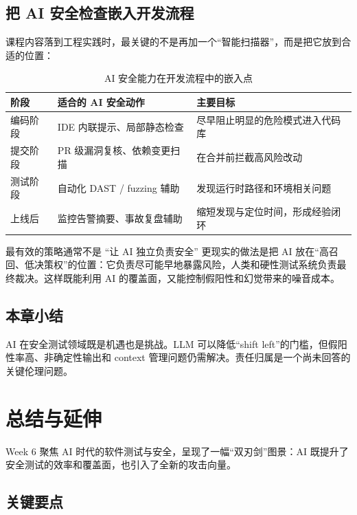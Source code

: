 \documentclass[a4paper]{article}
\begin{document}
\subsection{把 AI 安全检查嵌入开发流程}

课程内容落到工程实践时，最关键的不是再加一个“智能扫描器”，而是把它放到合适的位置：

\begin{table}[H]
\centering
\begin{tabular}{p{} p{} p{}}
\toprule
阶段 & 适合的 AI 安全动作 & 主要目标 \\
\midrule
编码阶段 & IDE 内联提示、局部静态检查 & 尽早阻止明显的危险模式进入代码库 \\
提交阶段 & PR 级漏洞复核、依赖变更扫描 & 在合并前拦截高风险改动 \\
测试阶段 & 自动化 DAST / fuzzing 辅助 & 发现运行时路径和环境相关问题 \\
上线后 & 监控告警摘要、事故复盘辅助 & 缩短发现与定位时间，形成经验闭环 \\
\bottomrule
\end{tabular}
\caption{AI 安全能力在开发流程中的嵌入点}
\end{table}

\begin{knowledgebox}{最有效的策略通常不是 ``让 AI 独立负责安全''}
更现实的做法是把 AI 放在“高召回、低决策权”的位置：它负责尽可能早地暴露风险，人类和硬性测试系统负责最终裁决。这样既能利用 AI 的覆盖面，又能控制假阳性和幻觉带来的噪音成本。
\end{knowledgebox}

\subsection{本章小结}

AI 在安全测试领域既是机遇也是挑战。LLM 可以降低``shift left''的门槛，但假阳性率高、非确定性输出和 context 管理问题仍需解决。责任归属是一个尚未回答的关键伦理问题。

\section{总结与延伸}

Week 6 聚焦 AI 时代的软件测试与安全，呈现了一幅``双刃剑''图景：AI 既提升了安全测试的效率和覆盖面，也引入了全新的攻击向量。

\subsection{关键要点}
\end{document}

